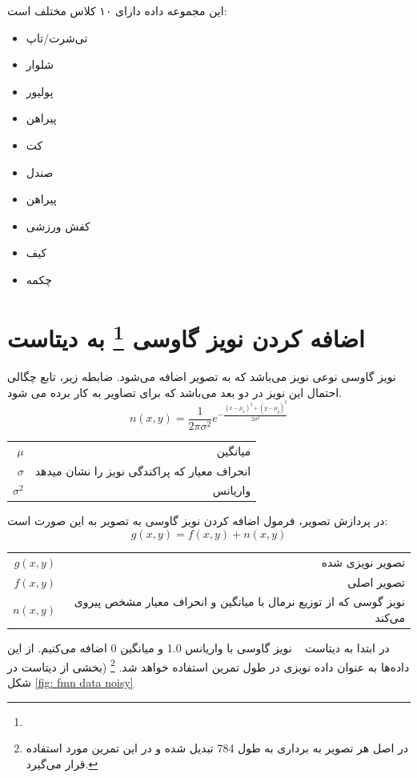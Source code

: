 \documentclass[12pt]{article}
\newcommand{\fm}{\lr{Fashion MNIST}}
\begin{document}
	این مجموعه داده دارای ۱۰ کلاس مختلف است:
	\begin{itemize}
		\item تی‌شرت/تاپ
		\item شلوار
		\item پولیور
		\item پیراهن
		\item کت
		\item صندل
		\item پیراهن
		\item کفش ورزشی
		\item کیف
		\item چکمه
	\end{itemize}	
	\section{اضافه کردن نویز گاوسی
		\footnote{}
		 به دیتاست}
	نویز گاوسی نوعی نویز می‌باشد که به تصویر اضافه می‌شود. 
	ضابطه زیر، تابع چگالی احتمال این نویز در دو بعد می‌باشد که برای تصاویر به کار برده می شود.
		\[ n(x,y) = \frac{1}{2\pi\sigma^2} e^{-\frac{(x-\mu_x)^2 + (y-\mu_y)^2}{2\sigma^2}} \]
		\begin{flushright}
			\begin{tabular}{r r}
				$\mu$ & میانگین\\
				$\sigma$ & انحراف معیار که پراکندگی نویز را نشان میدهد\\
				$\sigma^2$ & واریانس\\
			\end{tabular}
		\end{flushright}
		\newpage %
		\noindent
		در پردازش تصویر، فرمول اضافه کردن نویز گاوسی به تصویر به این صورت است:
		$$
		g(x,y) = f(x,y) + n(x,y)
		$$
		\begin{flushright}
			\begin{tabular}{r r}
				$g(x,y)$ & تصویر نویزی شده\\
				$f(x,y)$ & تصویر اصلی\\
				$n(x,y)$ & نویز گوسی که از توزیع نرمال با میانگین و انحراف معیار مشخص پیروی می‌کند\\
			\end{tabular}
		\end{flushright}
		در ابتدا به دیتاست
		\fm
		~ نویز گاوسی با واریانس 1.0 و میانگین 0 اضافه می‌کنیم. 
		از این داده‌ها به عنوان داده نویزی در طول تمرین استفاده خواهد شد.
		\footnote{در اصل هر تصویر به برداری به طول 784 تبدیل شده و در این تمرین مورد استفاده قرار می‌گیرد.}
		(بخشی از دیتاست در شکل 
		\ref{fig: fmn data noisy}
\end{document}
